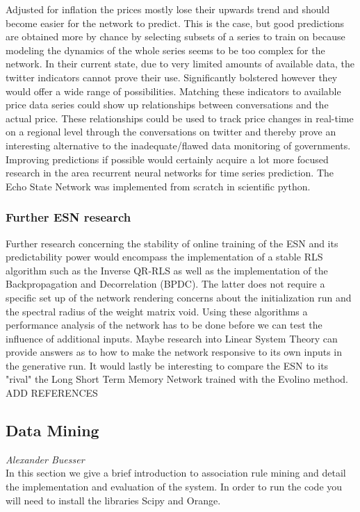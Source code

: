 Adjusted for inflation the prices mostly lose their upwards trend and should become easier for the network to predict. This is the case, but good predictions are obtained more by chance by selecting subsets of a series to train on because modeling the dynamics of the whole series seems to be too complex for the network. In their current state, due to very limited amounts of available data, the twitter indicators cannot prove their use. Significantly bolstered however they would offer a wide range of possibilities. Matching these indicators to available price data series could show up relationships between conversations and the actual price. These relationships could be used to track price changes in real-time on a regional level through the conversations on twitter and thereby prove an interesting alternative to the inadequate/flawed data monitoring of governments. Improving predictions if possible would certainly acquire a lot more focused research in the area recurrent neural networks for time series prediction. The Echo State Network was implemented from scratch in scientific python.

\subsubsection*{Further ESN research}
Further research concerning the stability of online training of the ESN and its predictability power would encompass the implementation of a stable RLS algorithm such as the Inverse QR-RLS as well as the implementation of the Backpropagation and Decorrelation (BPDC). The latter does not require a specific set up of the network rendering concerns about the initialization run and the spectral radius of the weight matrix void. Using these algorithms a performance analysis of the network has to be done before we can test the influence of additional inputs. Maybe research into Linear System Theory can provide answers as to how to make the network responsive to its own inputs in the generative run. It would lastly be interesting  to compare the ESN to its "rival" the Long Short Term Memory Network trained with the Evolino method.
ADD REFERENCES

\subsection*{Data Mining}
\emph{Alexander Buesser} \\

In this section we give a brief introduction to association rule mining and detail the implementation and evaluation of the system. In order to run the code you will need to install the libraries Scipy and Orange.

